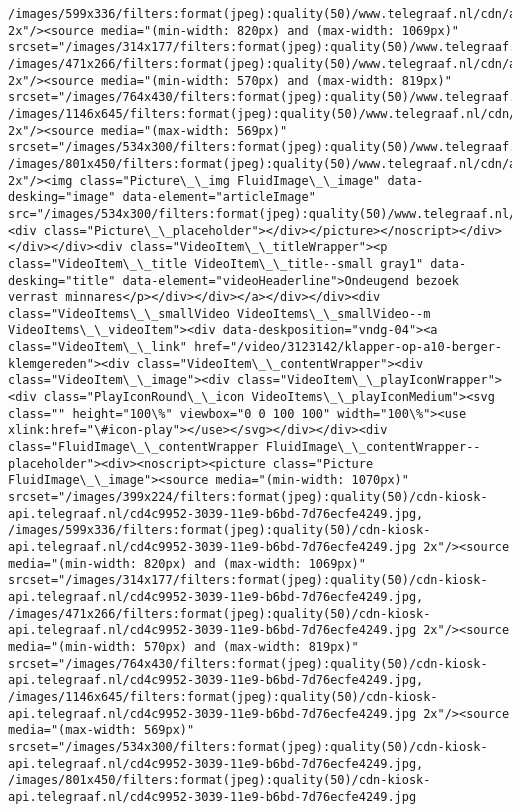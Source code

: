 \documentclass[11pt]{article}
\begin{document}
\begin{Verbatim}[commandchars=\\\{\}]
/images/599x336/filters:format(jpeg):quality(50)/www.telegraaf.nl/cdn/a607581c2a162c70bc9660d14dceb8bd.jpeg 2x"/><source media="(min-width: 820px) and (max-width: 1069px)" srcset="/images/314x177/filters:format(jpeg):quality(50)/www.telegraaf.nl/cdn/a607581c2a162c70bc9660d14dceb8bd.jpeg, /images/471x266/filters:format(jpeg):quality(50)/www.telegraaf.nl/cdn/a607581c2a162c70bc9660d14dceb8bd.jpeg 2x"/><source media="(min-width: 570px) and (max-width: 819px)" srcset="/images/764x430/filters:format(jpeg):quality(50)/www.telegraaf.nl/cdn/a607581c2a162c70bc9660d14dceb8bd.jpeg, /images/1146x645/filters:format(jpeg):quality(50)/www.telegraaf.nl/cdn/a607581c2a162c70bc9660d14dceb8bd.jpeg 2x"/><source media="(max-width: 569px)" srcset="/images/534x300/filters:format(jpeg):quality(50)/www.telegraaf.nl/cdn/a607581c2a162c70bc9660d14dceb8bd.jpeg, /images/801x450/filters:format(jpeg):quality(50)/www.telegraaf.nl/cdn/a607581c2a162c70bc9660d14dceb8bd.jpeg 2x"/><img class="Picture\_\_img FluidImage\_\_image" data-desking="image" data-element="articleImage" src="/images/534x300/filters:format(jpeg):quality(50)/www.telegraaf.nl/cdn/a607581c2a162c70bc9660d14dceb8bd.jpeg"/><div class="Picture\_\_placeholder"></div></picture></noscript></div></div></div><div class="VideoItem\_\_titleWrapper"><p class="VideoItem\_\_title VideoItem\_\_title--small gray1" data-desking="title" data-element="videoHeaderline">Ondeugend bezoek verrast minnares</p></div></div></a></div></div><div class="VideoItems\_\_smallVideo VideoItems\_\_smallVideo--m VideoItems\_\_videoItem"><div data-deskposition="vndg-04"><a class="VideoItem\_\_link" href="/video/3123142/klapper-op-a10-berger-klemgereden"><div class="VideoItem\_\_contentWrapper"><div class="VideoItem\_\_image"><div class="VideoItem\_\_playIconWrapper"><div class="PlayIconRound\_\_icon VideoItems\_\_playIconMedium"><svg class="" height="100\%" viewbox="0 0 100 100" width="100\%"><use xlink:href="\#icon-play"></use></svg></div></div><div class="FluidImage\_\_contentWrapper FluidImage\_\_contentWrapper--placeholder"><div><noscript><picture class="Picture FluidImage\_\_image"><source media="(min-width: 1070px)" srcset="/images/399x224/filters:format(jpeg):quality(50)/cdn-kiosk-api.telegraaf.nl/cd4c9952-3039-11e9-b6bd-7d76ecfe4249.jpg, /images/599x336/filters:format(jpeg):quality(50)/cdn-kiosk-api.telegraaf.nl/cd4c9952-3039-11e9-b6bd-7d76ecfe4249.jpg 2x"/><source media="(min-width: 820px) and (max-width: 1069px)" srcset="/images/314x177/filters:format(jpeg):quality(50)/cdn-kiosk-api.telegraaf.nl/cd4c9952-3039-11e9-b6bd-7d76ecfe4249.jpg, /images/471x266/filters:format(jpeg):quality(50)/cdn-kiosk-api.telegraaf.nl/cd4c9952-3039-11e9-b6bd-7d76ecfe4249.jpg 2x"/><source media="(min-width: 570px) and (max-width: 819px)" srcset="/images/764x430/filters:format(jpeg):quality(50)/cdn-kiosk-api.telegraaf.nl/cd4c9952-3039-11e9-b6bd-7d76ecfe4249.jpg, /images/1146x645/filters:format(jpeg):quality(50)/cdn-kiosk-api.telegraaf.nl/cd4c9952-3039-11e9-b6bd-7d76ecfe4249.jpg 2x"/><source media="(max-width: 569px)" srcset="/images/534x300/filters:format(jpeg):quality(50)/cdn-kiosk-api.telegraaf.nl/cd4c9952-3039-11e9-b6bd-7d76ecfe4249.jpg, /images/801x450/filters:format(jpeg):quality(50)/cdn-kiosk-api.telegraaf.nl/cd4c9952-3039-11e9-b6bd-7d76ecfe4249.jpg 
\end{Verbatim}
\end{document}
